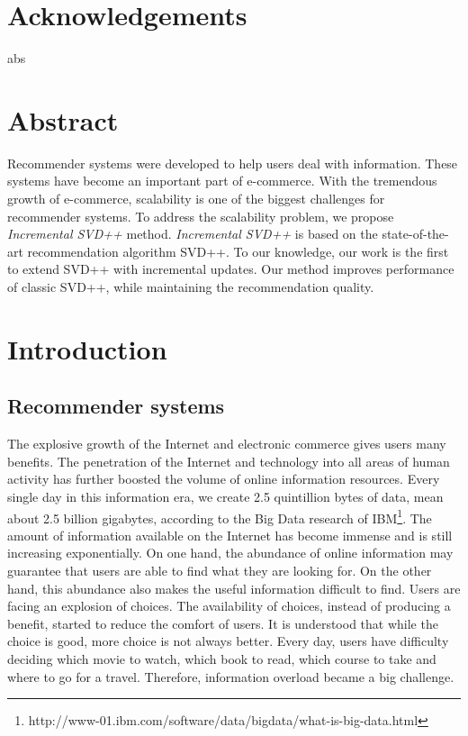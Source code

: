 \documentclass[oneside,13pt]{extreport}
\begin{document}
\clearpage
%
\chapter*{Acknowledgements}
\renewcommand{\thepage}{\roman{page}}
\setcounter{page}{1}

abs

\renewcommand\contentsname{Table of contents}
\tableofcontents
\clearpage

\listoffigures
 \clearpage
 
\listoftables
 

\chapter*{Abstract}
Recommender systems were developed to help users deal with information. These systems have become an important part of e-commerce. With the tremendous growth of e-commerce, scalability is one of the biggest challenges for recommender systems. 
To address the scalability problem, we propose \textit{Incremental SVD++} method. \textit{Incremental SVD++} is based on the state-of-the-art recommendation algorithm SVD++. To our knowledge, our work is the first to extend SVD++ with incremental updates. Our method improves performance of classic SVD++, while maintaining the recommendation quality.

\chapter{Introduction}
\renewcommand{\thepage}{\arabic{page}}
\setcounter{page}{1}
\section{Recommender systems}
The explosive growth  of the Internet and electronic commerce gives users many benefits. The penetration of the Internet and technology into all areas of human activity has further boosted the volume of online information resources. Every single day in this information era, we create 2.5 quintillion bytes of data, mean about 2.5 billion gigabytes, according to the Big Data research of IBM\footnote{http://www-01.ibm.com/software/data/bigdata/what-is-big-data.html}. The amount of information available on the Internet has become immense and is still increasing exponentially. On one hand, the abundance of online information may guarantee that users are able to find what they are looking for. On the other hand, this abundance also makes the useful information difficult to find. Users are facing an explosion of choices. The availability of choices, instead of producing a benefit, started to reduce the comfort of users. It is understood that while the choice is good, more choice is not always better. Every day, users have difficulty deciding which movie to watch, which book to read, which course to take and where to go for a travel. Therefore, information overload became a big challenge. 
\end{document}
